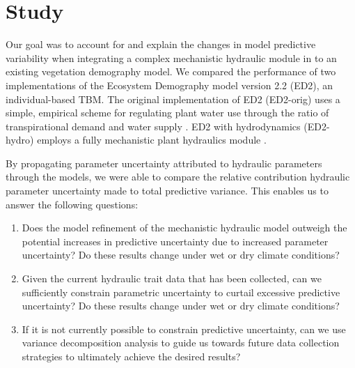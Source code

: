 \section*{Study}

Our goal was to account for and explain the changes in model predictive variability when integrating a complex mechanistic hydraulic module in to an existing vegetation demography model. We compared the performance of two implementations of the Ecosystem Demography model version 2.2 (ED2), an individual-based TBM. The original implementation of ED2 (ED2-orig) uses a simple, empirical scheme for regulating plant water use through the ratio of transpirational demand and water supply \citep{moorcroft_2001, medvigy_2009, xu_2016, longo_2019}. ED2 with hydrodynamics (ED2-hydro) employs a fully mechanistic plant hydraulics module \citep{medvigy_2009, powell_2018, xu_2016, longo_2019}. 

By propagating parameter uncertainty attributed to hydraulic parameters through the models, we were able to compare the relative contribution hydraulic parameter uncertainty made to total predictive variance. This enables us to answer the following questions: 

\begin{enumerate}
    \item Does the model refinement of the mechanistic hydraulic model outweigh the potential increases in predictive uncertainty due to increased parameter uncertainty? Do these results change under wet or dry climate conditions?
    \item Given the current hydraulic trait data that has been collected, can we sufficiently constrain parametric uncertainty to curtail excessive predictive uncertainty? Do these results change under wet or dry climate conditions?
    \item If it is not currently possible to constrain predictive uncertainty, can we use variance decomposition analysis to guide us towards future data collection strategies to ultimately achieve the desired results?
\end{enumerate}